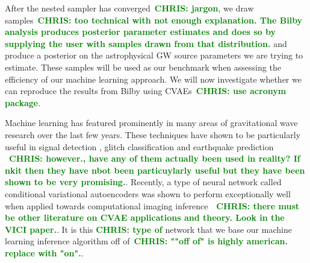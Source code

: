 \documentclass[%
showpacs,
 amsmath,amssymb,
 aps,
 twocolumn,
 prl,
 reprint,
floatfix,
]{revtex4-1}
\newcommand{\chris}[1]{\textbf{\textcolor{green}{CHRIS: #1}}}
\begin{document}
%
% 
After the nested sampler has converged~\chris{jargon}, we draw
samples~\chris{too technical with not enough explanation. The Bilby analysis
produces posterior parameter estimates and does so by supplying the user with
samples drawn from that distribution.} and produce a posterior on the
astrophysical \ac{GW} source parameters we are trying to estimate. These
samples will be used as our benchmark when assessing the efficiency of our
machine learning approach.  We will now investigate whether we can reproduce
the results from Bilby using CVAEs~\chris{use acronym package}. 
   

%
%
Machine learning has featured prominently in many areas of gravitational wave
research over the last few years.  These techniques have shown to be
particularly useful in signal detection
\cite{PhysRevLett.120.141103,GEORGE201864,1904.08693}, glitch classification
\cite{1706.07446,0264-9381-34-6-064003} and earthquake prediction
\cite{Coughlin_2017}~\chris{however., have any of them actually been used in
reality? If nkit then they have nbot been particuylarly useful but they have
been shown to be very promising.}. Recently, a type of neural network called
conditional variational autoencoders was shown to perform exceptionally well
when applied towards computational imaging
inference~\cite{1904.06264}~\chris{there must be other literature on CVAE
applications and theory. Look in the VICI paper.}. It is this \chris{type of}
network that we base our machine learning inference algorithm off
of~\chris{""off of" is highly american. replace with "on".}.
\end{document}
